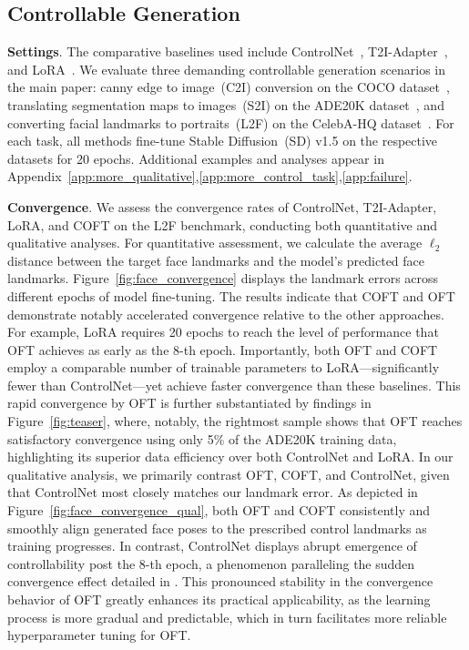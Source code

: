 \subsection{Controllable Generation}

\textbf{Settings}. The comparative baselines used include ControlNet~\cite{zhang2023adding}, T2I-Adapter~\cite{mou2023t2i}, and LoRA~\cite{hulora2022}. We evaluate three demanding controllable generation scenarios in the main paper: canny edge to image~(C2I) conversion on the COCO dataset~\cite{lin2014microsoft}, translating segmentation maps to images~(S2I) on the ADE20K dataset~\cite{zhou2017scene}, and converting facial landmarks to portraits~(L2F) on the CelebA-HQ dataset~\cite{karras2018progressive,xia2021tedigan}. For each task, all methods fine-tune Stable Diffusion~(SD) v1.5 on the respective datasets for 20 epochs. Additional examples and analyses appear in Appendix~\ref{app:more_qualitative},\ref{app:more_control_task},\ref{app:failure}.

\textbf{Convergence}. We assess the convergence rates of ControlNet, T2I-Adapter, LoRA, and COFT on the L2F benchmark, conducting both quantitative and qualitative analyses. For quantitative assessment, we calculate the average $\ell_2$ distance between the target face landmarks and the model’s predicted face landmarks. Figure~\ref{fig:face_convergence} displays the landmark errors across different epochs of model fine-tuning. The results indicate that COFT and OFT demonstrate notably accelerated convergence relative to the other approaches. For example, LoRA requires 20 epochs to reach the level of performance that OFT achieves as early as the 8-th epoch. Importantly, both OFT and COFT employ a comparable number of trainable parameters to LoRA—significantly fewer than ControlNet—yet achieve faster convergence than these baselines. This rapid convergence by OFT is further substantiated by findings in Figure~\ref{fig:teaser}, where, notably, the rightmost sample shows that OFT reaches satisfactory convergence using only 5\% of the ADE20K training data, highlighting its superior data efficiency over both ControlNet and LoRA. In our qualitative analysis, we primarily contrast OFT, COFT, and ControlNet, given that ControlNet most closely matches our landmark error. As depicted in Figure~\ref{fig:face_convergence_qual}, both OFT and COFT consistently and smoothly align generated face poses to the prescribed control landmarks as training progresses. In contrast, ControlNet displays abrupt emergence of controllability post the 8-th epoch, a phenomenon paralleling the sudden convergence effect detailed in \cite{zhang2023adding}. This pronounced stability in the convergence behavior of OFT greatly enhances its practical applicability, as the learning process is more gradual and predictable, which in turn facilitates more reliable hyperparameter tuning for OFT.

